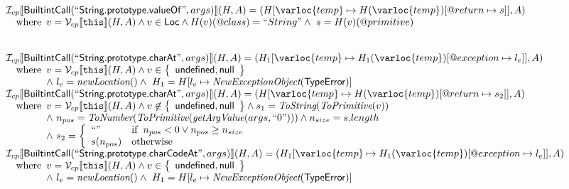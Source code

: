 \[\begin{array}{l}
\I _{cp}\lbr \SF{BuiltintCall}(``\SF{String.prototype.valueOf}",args)\rbr(H,A)
 = (H[\varloc{temp}\mapsto H(\varloc{temp})[\varprop{return}\mapsto s]], A) \\
\quad\wherec{ 
  v = \V _{cp}\lbr \TT{this}\rbr (H,A) \land v \in \SF{Loc} \land H(v)(@class) = ``String"
  \land\ s = H(v)(\varprop{primitive})
  }\\
\\\\



\I _{cp}\lbr \SF{BuiltintCall}(``\SF{String.prototype.charAt}",args)\rbr(H,A)
 = (H_1[\varloc{temp}\mapsto H_1(\varloc{temp})[\varprop{exception}\mapsto l_e]], A) \\
\quad\wherec{
  v = \V _{cp}\lbr \TT{this}\rbr (H,A) \land v \in \set{\SF{undefined}, \SF{null}}\\
  \land\ l_e = \hf{newLocation}() \land\ H_1=H[l_e\mapsto\hf{NewExceptionObject}(\SF{TypeError})] 
  }\\
  
\I _{cp}\lbr \SF{BuiltintCall}(``\SF{String.prototype.charAt}",args)\rbr(H,A)
 = (H[\varloc{temp}\mapsto H(\varloc{temp})[\varprop{return}\mapsto s_2]], A) \\
\quad\wherec{
  v = \V _{cp}\lbr \TT{this}\rbr (H,A) \land v \not\in \set{\SF{undefined}, \SF{null}}
  \land s_1 = \hf{ToString}(\hf{ToPrimitive}(v))\\
  \land\ n_{pos} = \hf{ToNumber}(\hf{ToPrimitive}(\hf{getArgValue}(args, ``0"))) \land n_{size} = s.length\\
  \land\ s_2 = \left\{\begin{array}{ll}
      ``"& \ifc{n_{pos} < 0 \lor n_{pos} \geq n_{size}}\\
      s(n_{pos}) & \owc\\
    \end{array}\right.
  }\\

\I _{cp}\lbr \SF{BuiltintCall}(``\SF{String.prototype.charCodeAt}",args)\rbr(H,A)
 = (H_1[\varloc{temp}\mapsto H_1(\varloc{temp})[\varprop{exception}\mapsto l_e]], A) \\
\quad\wherec{
  v = \V _{cp}\lbr \TT{this}\rbr (H,A) \land v \in \set{\SF{undefined}, \SF{null}}\\
  \land\ l_e = \hf{newLocation}() \land\ H_1=H[l_e\mapsto\hf{NewExceptionObject}(\SF{TypeError})] 
  }\\
  

\end{array}\]
